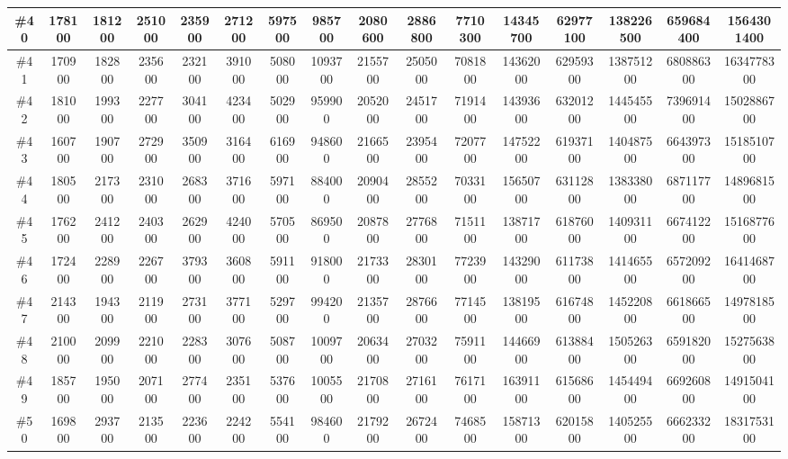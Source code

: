 \documentclass[titlepage]{article}
\begin{document}
\begin{landscape}
\begin{table}[h]
\begin{tabular}{|c|c|c|c|c|c|c|c|c|c|c|c|c|c|c|c|}
			\hline
			\#40     & 178100 & 181200 & 251000 & 235900 & 271200 & 597500 & 985700  & 2080600 & 2886800 & 7710300 & 14345700 & 62977100 & 138226500 & 659684400 & 1564301400  \\ 
			\hline
			\#41     & 170900 & 182800 & 235600 & 232100 & 391000 & 508000 & 1093700 & 2155700 & 2505000 & 7081800 & 14362000 & 62959300 & 138751200 & 680886300 & 1634778300  \\ 
			\hline
			\#42     & 181000 & 199300 & 227700 & 304100 & 423400 & 502900 & 959900  & 2052000 & 2451700 & 7191400 & 14393600 & 63201200 & 144545500 & 739691400 & 1502886700  \\ 
			\hline
			\#43     & 160700 & 190700 & 272900 & 350900 & 316400 & 616900 & 948600  & 2166500 & 2395400 & 7207700 & 14752200 & 61937100 & 140487500 & 664397300 & 1518510700  \\ 
			\hline
			\#44     & 180500 & 217300 & 231000 & 268300 & 371600 & 597100 & 884000  & 2090400 & 2855200 & 7033100 & 15650700 & 63112800 & 138338000 & 687117700 & 1489681500  \\ 
			\hline
			\#45     & 176200 & 241200 & 240300 & 262900 & 424000 & 570500 & 869500  & 2087800 & 2776800 & 7151100 & 13871700 & 61876000 & 140931100 & 667412200 & 1516877600  \\ 
			\hline
			\#46     & 172400 & 228900 & 226700 & 379300 & 360800 & 591100 & 918000  & 2173300 & 2830100 & 7723900 & 14329000 & 61173800 & 141465500 & 657209200 & 1641468700  \\ 
			\hline
			\#47     & 214300 & 194300 & 211900 & 273100 & 377100 & 529700 & 994200  & 2135700 & 2876600 & 7714500 & 13819500 & 61674800 & 145220800 & 661866500 & 1497818500  \\ 
			\hline
			\#48     & 210000 & 209900 & 221000 & 228300 & 307600 & 508700 & 1009700 & 2063400 & 2703200 & 7591100 & 14466900 & 61388400 & 150526300 & 659182000 & 1527563800  \\ 
			\hline
			\#49     & 185700 & 195000 & 207100 & 277400 & 235100 & 537600 & 1005500 & 2170800 & 2716100 & 7617100 & 16391100 & 61568600 & 145449400 & 669260800 & 1491504100  \\ 
			\hline
			\#50     & 169800 & 293700 & 213500 & 223600 & 224200 & 554100 & 984600  & 2179200 & 2672400 & 7468500 & 15871300 & 62015800 & 140525500 & 666233200 & 1831753100  \\
			\hline
		\end{tabular}
	\end{table}
\end{landscape}
\end{document}
